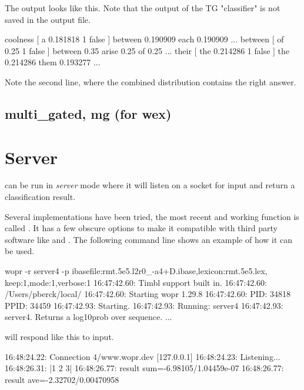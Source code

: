 \documentclass[a4paper,10pt,twoside]{report}
\begin{document}
The output looks like this. Note that the output of the TG
"classifier" is not saved in the output file.

\begin{wout}{}
coolness [ a 0.181818 1 false ] { between 0.190909 each 0.190909 ... }
between [ of 0.25 1 false ] { between 0.35 arise 0.25 of 0.25 ... }
their [ the 0.214286 1 false ] { the 0.214286 them 0.193277 ... }
\end{wout}

Note the second line, where the combined distribution contains the
right answer.

\subsection{multi\_gated, mg (for wex)} %

\section{Server}

\Wopr{} can be run in \emph{server} mode where it will listen on a socket
for input and return a classification result.

Several implementations have been tried, the most recent and working
function is called . It has a few obscure options to make
it compatible with third party software like  and
\pbmbmt{}. The following command line shows an example of how it
can be used.

\begin{bash}{}

wopr -r server4 -p ibasefile:rmt.5e5.l2r0_-a4+D.ibase,lexicon:rmt.5e5.lex,
                   keep:1,mode:1,verbose:1
16:47:42.60: Timbl support built in.
16:47:42.60: /Users/pberck/local/
16:47:42.60: Starting wopr 1.29.8
16:47:42.60: PID:  34818 PPID:  34459
16:47:42.93: Starting.
16:47:42.93: Running: server4
16:47:42.93: server4. Returns a log10prob over sequence.
...
\end{bash}

\Wopr{} will respond like this to input.

\begin{wout}{}
16:48:24.22: Connection 4/www.wopr.dev [127.0.0.1]
16:48:24.23: Listening...
16:48:26.31: |1 2 3|
16:48:26.77: result sum=-6.98105/1.04459e-07
16:48:26.77: result ave=-2.32702/0.00470958
\end{wout}
\end{document}
